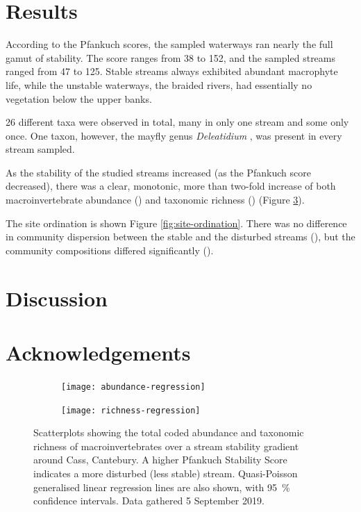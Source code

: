 \documentclass[a4paper,10pt]{article}
\newcommand\inputresults[1]{\unskip}
\newcommand\spbinom[1]{%
	\emph{#1}%
}
\newcommand\datadate{5 September 2019} %
\begin{document}
\section*{Results}

According to the Pfankuch scores, the sampled waterways ran nearly the full gamut of stability.
The score ranges from 38 to 152, and the sampled streams ranged from 47 to 125.
Stable streams always exhibited abundant macrophyte life, while the unstable waterways, the braided rivers, had essentially no vegetation below the upper banks.

26 different taxa were observed in total, many in only one stream and some only once.
One taxon, however, the mayfly genus \spbinom{Deleatidium}, was present in every stream sampled.


As the stability of the studied streams increased (as the Pfankuch score decreased), there was a clear, monotonic, more than two-fold increase of both macroinvertebrate abundance (\inputresults{abundance-regression}) and taxonomic richness (\inputresults{richness-regression}) (Figure \ref{fig:regressions}).

The site ordination is shown Figure \ref{fig:site-ordination}.
There was no difference in community dispersion between the stable and the disturbed streams (\inputresults{permdisp}), but the community compositions differed significantly (\inputresults{permanova}).

\section*{Discussion}

\section*{Acknowledgements}

\clearpage

\begin{figure}[p]
	\centering
	\begin{subfigure}[t]{\textwidth}
		\centering
		\texttt{[image: abundance-regression]}
		\caption{}\label{fig:abundance-regression}
	\end{subfigure}
	\begin{subfigure}[t]{\textwidth}
		\centering
		\texttt{[image: richness-regression]}
		\caption{}\label{fig:richness-regression}
	\end{subfigure}
	\caption[Regression plots]{ %
		Scatterplots showing the total coded abundance and taxonomic richness of macroinvertebrates over a stream stability gradient around Cass, Cantebury.
		A higher Pfankuch Stability Score indicates a more disturbed (less stable) stream.
		Quasi-Poisson generalised linear regression lines are also shown, with \SI{95}{\percent} confidence intervals.
		Data gathered {\datadate}.
	}\label{fig:regressions}
\end{figure}
\end{document}
